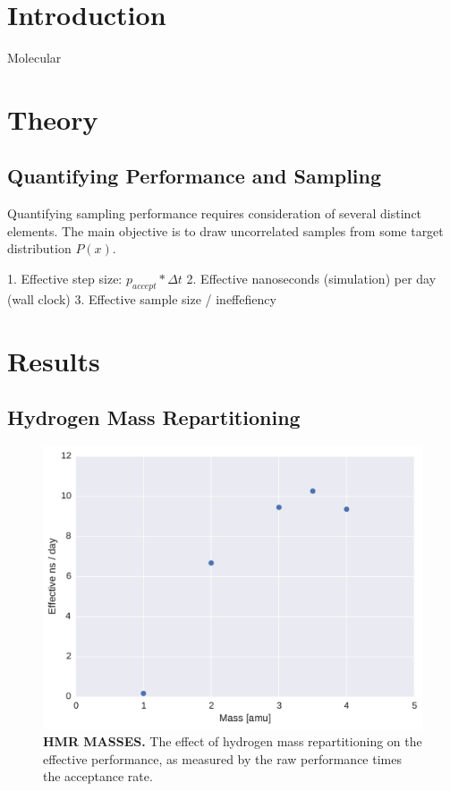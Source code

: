 \documentclass[aps,pre,twocolumn,nofootinbib,superscriptaddress,linenumbers]{revtex4-1}
\begin{document}
\section{Introduction}

Molecular

\section{Theory}

\subsection{Quantifying Performance and Sampling}

Quantifying sampling performance requires consideration of several distinct elements.  
The main objective is to draw uncorrelated samples from some target distribution $P(x)$.  

1.  Effective step size: $p_{accept} * \Delta t$
2.  Effective nanoseconds (simulation) per day (wall clock)
3.  Effective sample size / ineffefiency



\section{Results}

\subsection{Hydrogen Mass Repartitioning}

\begin{figure}
\includegraphics[width=\columnwidth]{./figures/hmr_masses.pdf}
\caption{{\bf HMR MASSES.}
The effect of hydrogen mass repartitioning on the effective performance, as measured by the raw performance times the acceptance rate.
}
\label{figure:hmr_masses}
\end{figure}
\end{document}
